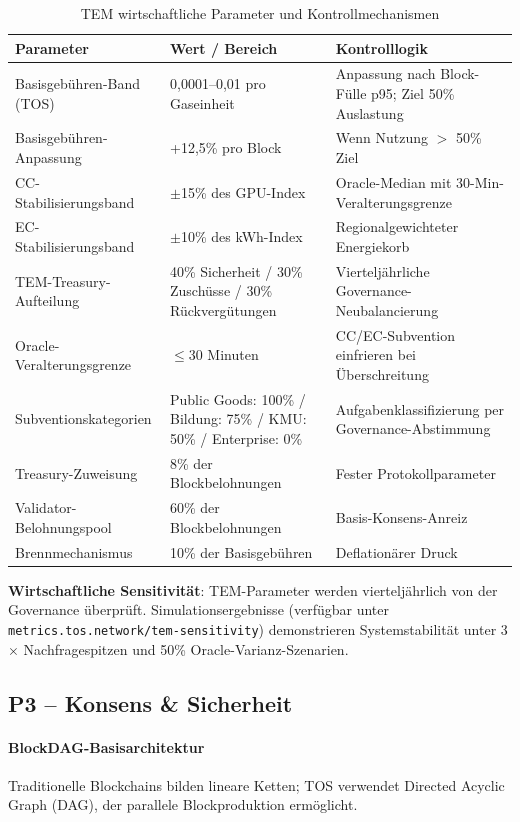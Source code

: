 \documentclass[11pt]{article}
\begin{document}
\begin{table}[H]
\centering
\caption{TEM wirtschaftliche Parameter und Kontrollmechanismen}
\label{tab:tem-parameters}
\begin{tabular}{@{}p{}p{}p{}@{}}
\toprule
\textbf{Parameter} & \textbf{Wert / Bereich} & \textbf{Kontrolllogik} \\ \midrule
Basisgebühren-Band (TOS) & 0,0001--0,01 pro Gaseinheit & Anpassung nach Block-Fülle p95; Ziel 50\% Auslastung \\
Basisgebühren-Anpassung & +12,5\% pro Block & Wenn Nutzung $>$ 50\% Ziel \\
CC-Stabilisierungsband & $\pm$15\% des GPU-Index & Oracle-Median mit 30-Min-Veralterungsgrenze \\
EC-Stabilisierungsband & $\pm$10\% des kWh-Index & Regionalgewichteter Energiekorb \\
TEM-Treasury-Aufteilung & 40\% Sicherheit / 30\% Zuschüsse / 30\% Rückvergütungen & Vierteljährliche Governance-Neubalancierung \\
Oracle-Veralterungsgrenze & $\le$30 Minuten & CC/EC-Subvention einfrieren bei Überschreitung \\
Subventionskategorien & Public Goods: 100\% / Bildung: 75\% / KMU: 50\% / Enterprise: 0\% & Aufgabenklassifizierung per Governance-Abstimmung \\
Treasury-Zuweisung & 8\% der Blockbelohnungen & Fester Protokollparameter \\
Validator-Belohnungspool & 60\% der Blockbelohnungen & Basis-Konsens-Anreiz \\
Brennmechanismus & 10\% der Basisgebühren & Deflationärer Druck \\
\bottomrule
\end{tabular}
\end{table}

\textbf{Wirtschaftliche Sensitivität}: TEM-Parameter werden vierteljährlich von der Governance überprüft. Simulationsergebnisse (verfügbar unter \texttt{metrics.tos.network/tem-sensitivity}) demonstrieren Systemstabilität unter 3$\times$ Nachfragespitzen und 50\% Oracle-Varianz-Szenarien.

\subsection{P3 -- Konsens \& Sicherheit}
\label{sec:pillar-consensus}

\paragraph{BlockDAG-Basisarchitektur}
Traditionelle Blockchains bilden lineare Ketten; TOS verwendet Directed Acyclic Graph (DAG), der parallele Blockproduktion ermöglicht.
\end{document}
